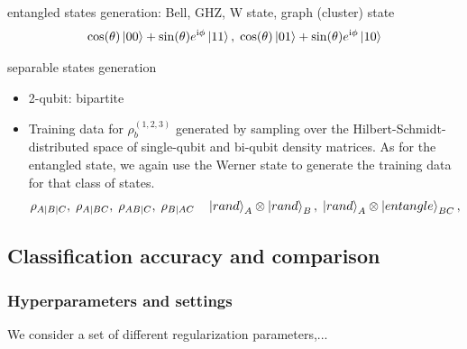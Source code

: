 \documentclass[
aps,
pra,
floatfix,
]{revtex4-2}
\theoremstyle{plain}
\theoremstyle{definition}
\newcommand{\dm}{\rho}
\begin{document}
entangled states generation: Bell, GHZ, W state, graph (cluster) state
\begin{equation}
	\cos(\theta) \ket{00} + \sin(\theta)e^{\textup{i} \phi} \ket{11}
	,\;
	\cos(\theta) \ket{01} + \sin(\theta)e^{\textup{i} \phi} \ket{10}
\end{equation}

separable states generation
\begin{itemize}
	\item 2-qubit: bipartite
	\item Training data for $\dm_b^{(1,2,3)}$ generated by sampling over the Hilbert-Schmidt-distributed space of single-qubit and bi-qubit density matrices. As for the entangled state, we again use the Werner state to generate the training data for that class of states.
	\begin{equation}
		\dm_{A|B|C},\;
		\dm_{A|BC},\;
		\dm_{AB|C},\;
		\dm_{B|AC}
		\quad
		\ket{rand}_A \otimes \ket{rand}_B,\;
		\ket{rand}_A \otimes \ket{entangle}_{BC},\;
	\end{equation}
\end{itemize}

\subsection{Classification accuracy and comparison}
\subsubsection{Hyperparameters and settings}
We consider a set of different regularization parameters,...
\end{document}
